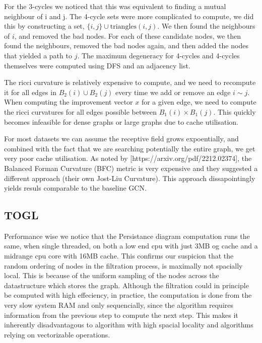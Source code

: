 \documentclass[a4paper,12pt]{article}
\begin{document}
For the 3-cycles we noticed that this was equivalent to finding a mutual neighbour of i and j.
The 4-cycle sets were more complicated to compute, we did this by constructing a set, \(\{i, j\} \cup \text{triangles}(i, j)\). We then found the neighbours of \(i\), and removed the bad nodes.
For each of these candidate nodes, we then found the neighbours, removed the bad nodes again, and then added the nodes that yielded a path to \(j\).
The maximum degeneracy for 4-cycles and 4-cycles themselves were computed using DFS and an adjacency list.

The ricci curvature is relatively expensive to compute, and we need to recompute it for all edges in \(B_2(i) \cup B_2(j)\) every time we add or remove an edge \(i \sim j\). 
When computing the improvement vector \(x\) for a given edge, we need to compute the ricci curvatures for all edges possible between \(B_1(i) \times B_1(j)\). 
This quickly becomes infeasible for dense graphs or large graphs due to cache utilisation.

For most datasets we can assume the receptive field grows expoentially, and combined with the fact that we are searching potentially the entire graph, we get very poor cache utilisation.
As noted by [https://arxiv.org/pdf/2212.02374], the Balanced Forman Curvature (BFC) metric is very expensive and they suggested a different
approach (their own Jost-Liu Curvature). This approach dissapointingly yields resuls comparable to the baseline GCN.

\subsection{TOGL}

Performance wise we notice that the Persistance diagram computation runs the same, when single threaded, on both a low end cpu with just 3MB og cache and a midrange cpu core with 16MB cache. This confirms our suspicion that the random ordering of nodes in the filtration process, is maximally not spacially local. This is because of the uniform sampling of the nodes across the datastructure which stores the graph. Although the filtration could in principle be computed with high effeciency, in practice, the computation is done from the very slow system RAM and only sequencially, since the algorithm requires information from the previous step to compute the next step. This makes it inherently disadvantagous to algorithm with high spacial locality and algorithms relying on vectorizable operations.
\end{document}
